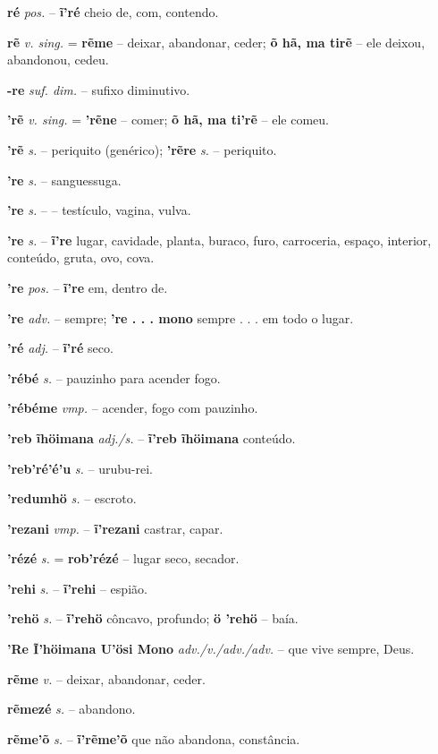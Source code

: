 \textbf{ré} \textit{pos.} -- \textbf{ĩ'ré} cheio de, com, contendo.

\textbf{rẽ} \textit{v. sing.} = \textbf{rẽme} -- deixar, abandonar, ceder; \textbf{õ hã, ma tirẽ} -- ele deixou, abandonou, cedeu.

\textbf{-re} \textit{suf. dim.} -- sufixo diminutivo.

\textbf{'rẽ} \textit{v. sing.} = \textbf{'rẽne} -- comer; \textbf{õ hã, ma ti'rẽ} -- ele comeu.

\textbf{'rẽ} \textit{s.} -- periquito (genérico); \textbf{'rẽre} \textit{s.} -- periquito.

\textbf{'re} \textit{s.} -- sanguessuga.

\textbf{'re} \textit{s.} -- -- testículo, vagina, vulva.

\textbf{'re} \textit{s.} -- \textbf{ĩ're} lugar, cavidade, planta, buraco, furo, carroceria, espaço, interior, conteúdo, gruta, ovo, cova.

\textbf{'re} \textit{ pos.} -- \textbf{ĩ're} em, dentro de.

\textbf{'re} \textit{adv.} -- sempre; \textbf{'re . . . mono} sempre . . . em todo o lugar.

\textbf{'ré} \textit{adj.} -- \textbf{ĩ'ré} seco.

\textbf{'rébé} \textit{s.} -- pauzinho para acender fogo.

\textbf{'rébéme} \textit{vmp.} -- acender, fogo com pauzinho.

\textbf{'reb ĩhöimana} \textit{adj./s.} -- \textbf{ĩ'reb ĩhöimana} conteúdo.

\textbf{'reb'ré'é'u} \textit{s.} -- urubu-rei.

\textbf{'redumhö} \textit{s.} -- escroto.

\textbf{'rezani} \textit{vmp.} -- \textbf{ĩ'rezani} castrar, capar.

\textbf{'rézé} \textit{s.} = \textbf{rob'rézé} -- lugar seco, secador.

\textbf{'rehi} \textit{s.} -- \textbf{ĩ'rehi} -- espião.

\textbf{'rehö} \textit{s.} -- \textbf{ĩ'rehö} côncavo, profundo; \textbf{ö 'rehö} -- baía.

\textbf{'Re Ĩ'höimana U'ösi Mono} \textit{adv./v./adv./adv.} -- que vive sempre, Deus.

\textbf{rẽme} \textit{v.} -- deixar, abandonar, ceder.

\textbf{rẽmezé} \textit{s.} -- abandono.

\textbf{rẽme'õ} \textit{s.} -- \textbf{ĩ'rẽme'õ} que não abandona, constância.

